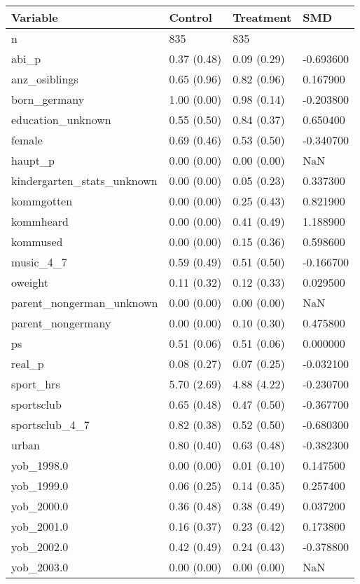 \begin{tabular}{llll}
\toprule
Variable & Control & Treatment & SMD \\
\midrule
n & 835 & 835 &  \\
abi\_p & 0.37 (0.48) & 0.09 (0.29) & -0.693600 \\
anz\_osiblings & 0.65 (0.96) & 0.82 (0.96) & 0.167900 \\
born\_germany & 1.00 (0.00) & 0.98 (0.14) & -0.203800 \\
education\_unknown & 0.55 (0.50) & 0.84 (0.37) & 0.650400 \\
female & 0.69 (0.46) & 0.53 (0.50) & -0.340700 \\
haupt\_p & 0.00 (0.00) & 0.00 (0.00) & NaN \\
kindergarten\_stats\_unknown & 0.00 (0.00) & 0.05 (0.23) & 0.337300 \\
kommgotten & 0.00 (0.00) & 0.25 (0.43) & 0.821900 \\
kommheard & 0.00 (0.00) & 0.41 (0.49) & 1.188900 \\
kommused & 0.00 (0.00) & 0.15 (0.36) & 0.598600 \\
music\_4\_7 & 0.59 (0.49) & 0.51 (0.50) & -0.166700 \\
oweight & 0.11 (0.32) & 0.12 (0.33) & 0.029500 \\
parent\_nongerman\_unknown & 0.00 (0.00) & 0.00 (0.00) & NaN \\
parent\_nongermany & 0.00 (0.00) & 0.10 (0.30) & 0.475800 \\
ps & 0.51 (0.06) & 0.51 (0.06) & 0.000000 \\
real\_p & 0.08 (0.27) & 0.07 (0.25) & -0.032100 \\
sport\_hrs & 5.70 (2.69) & 4.88 (4.22) & -0.230700 \\
sportsclub & 0.65 (0.48) & 0.47 (0.50) & -0.367700 \\
sportsclub\_4\_7 & 0.82 (0.38) & 0.52 (0.50) & -0.680300 \\
urban & 0.80 (0.40) & 0.63 (0.48) & -0.382300 \\
yob\_1998.0 & 0.00 (0.00) & 0.01 (0.10) & 0.147500 \\
yob\_1999.0 & 0.06 (0.25) & 0.14 (0.35) & 0.257400 \\
yob\_2000.0 & 0.36 (0.48) & 0.38 (0.49) & 0.037200 \\
yob\_2001.0 & 0.16 (0.37) & 0.23 (0.42) & 0.173800 \\
yob\_2002.0 & 0.42 (0.49) & 0.24 (0.43) & -0.378800 \\
yob\_2003.0 & 0.00 (0.00) & 0.00 (0.00) & NaN \\
\bottomrule
\end{tabular}
